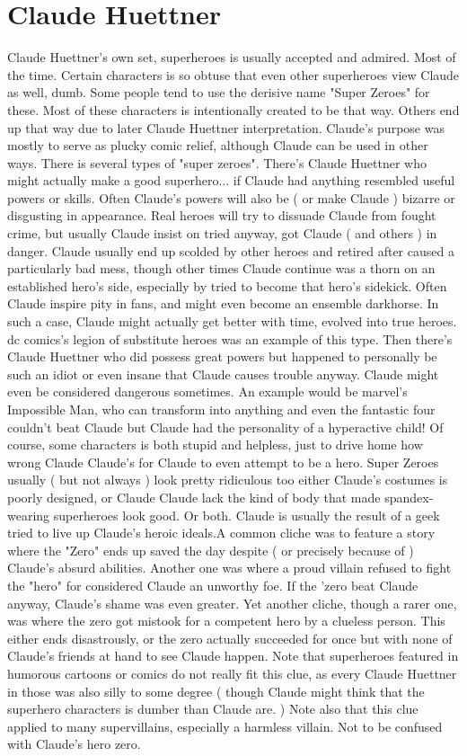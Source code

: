 \documentclass[12pt]{book}
\begin{document}
\chapter{Claude Huettner}

Claude Huettner's own set, superheroes is usually accepted and admired. Most of the time. Certain characters is so obtuse that even other superheroes view Claude as  well, dumb. Some people tend to use the derisive name "Super Zeroes" for these. Most of these characters is intentionally created to be that way. Others end up that way due to later Claude Huettner interpretation. Claude's purpose was mostly to serve as plucky comic relief, although Claude can be used in other ways. There is several types of "super zeroes". There's Claude Huettner who might actually make a good superhero... if Claude had anything resembled useful powers or skills. Often Claude's powers will also be ( or make Claude ) bizarre or disgusting in appearance. Real heroes will try to dissuade Claude from fought crime, but usually Claude insist on tried anyway, got Claude ( and others ) in danger. Claude usually end up scolded by other heroes and retired after caused a particularly bad mess, though other times Claude continue was a thorn on an established hero's side, especially by tried to become that hero's sidekick. Often Claude inspire pity in fans, and might even become an ensemble darkhorse. In such a case, Claude might actually get better with time, evolved into true heroes. dc comics's legion of substitute heroes was an example of this type. Then there's Claude Huettner who did possess great powers  but happened to personally be such an idiot  or even insane  that Claude causes trouble anyway. Claude might even be considered dangerous sometimes. An example would be marvel's Impossible Man, who can transform into anything and even the fantastic four couldn't beat Claude  but Claude had the personality of a hyperactive child! Of course, some characters is both stupid and helpless, just to drive home how wrong Claude Claude's for Claude to even attempt to be a hero. Super Zeroes usually ( but not always ) look pretty ridiculous too  either Claude's costumes is poorly designed, or Claude Claude lack the kind of body that made spandex-wearing superheroes look good. Or both. Claude is usually the result of a geek tried to live up Claude's heroic ideals.A common cliche was to feature a story where the "Zero" ends up saved the day despite ( or precisely because of ) Claude's absurd abilities. Another one was where a proud villain refused to fight the "hero" for considered Claude an unworthy foe. If the 'zero beat Claude anyway, Claude's shame was even greater. Yet another cliche, though a rarer one, was where the zero got mistook for a competent hero by a clueless person. This either ends disastrously, or the zero actually succeeded for once  but with none of Claude's friends at hand to see Claude happen. Note that superheroes featured in humorous cartoons or comics do not really fit this clue, as every Claude Huettner in those was also silly to some degree ( though Claude might think that the superhero characters is dumber than Claude are. ) Note also that this clue applied to many supervillains, especially a harmless villain. Not to be confused with Claude's hero zero. 
\end{document}
